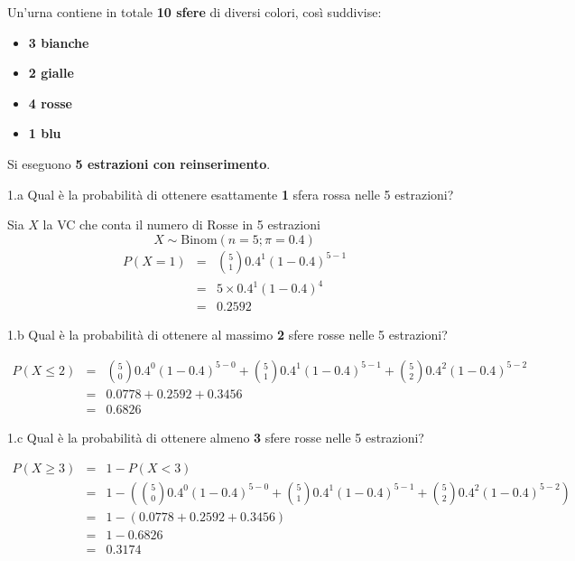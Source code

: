 \documentclass[
  11pt,
]{book}
\providecommand{\tightlist}{%
  \setlength{\itemsep}{0pt}\setlength{\parskip}{0pt}}
\theoremstyle{mytheoremstyle}
\theoremstyle{mydefstyle}
\newenvironment{sol}
  {
  \begin{tcolorbox}[enhanced,breakable,arc=0.1mm,boxrule=1pt,colback=white,colframe=iblue,
  title=\bf \fontfamily{lmss}\selectfont \hspace{.5 cm} Soluzione,drop fuzzy shadow]

}{
\end{tcolorbox}
  }
\begin{document}
Un'urna contiene in totale \textbf{10 sfere} di diversi colori, così suddivise:

\begin{itemize}
\tightlist
\item
  \textbf{3 bianche}\\
\item
  \textbf{2 gialle}\\
\item
  \textbf{4 rosse}\\
\item
  \textbf{1 blu}
\end{itemize}

Si eseguono \textbf{5 estrazioni con reinserimento}.

1.a Qual è la probabilità di ottenere esattamente \textbf{1} sfera rossa nelle 5 estrazioni?

\begin{sol}
Sia \(X\) la VC che conta il numero di Rosse in 5 estrazioni
\[
X\sim\text{Binom}(n=5;\pi=0.4)
\]
\normalsize 
\begin{eqnarray*}
      P( X = 1 ) &=& \binom{ 5 }{ 1 } 0.4 ^{ 1 }(1- 0.4 )^{ 5 - 1 } \\                 &=& 5 \times 0.4 ^{ 1 }(1- 0.4 )^{ 4 } \\                 &=& 0.2592 
   \end{eqnarray*}
\normalsize 

\end{sol}

1.b Qual è la probabilità di ottenere al massimo \textbf{2} sfere rosse nelle 5 estrazioni?

\begin{sol}
\normalsize 
\begin{eqnarray*}
      P( X \leq 2 ) &=& \binom{ 5 }{ 0 } 0.4 ^{ 0 }(1- 0.4 )^{ 5 - 0 }+\binom{ 5 }{ 1 } 0.4 ^{ 1 }(1- 0.4 )^{ 5 - 1 }+\binom{ 5 }{ 2 } 0.4 ^{ 2 }(1- 0.4 )^{ 5 - 2 } \\                 &=& 0.0778+0.2592+0.3456 \\                 &=& 0.6826 
   \end{eqnarray*}
\normalsize 

\end{sol}

1.c Qual è la probabilità di ottenere almeno \textbf{3} sfere rosse nelle 5 estrazioni?

\begin{sol}
\normalsize 
\begin{eqnarray*}
      P( X \geq 3 ) &=& 1-P( X < 3 ) \\                 &=& 1-\left( \binom{ 5 }{ 0 } 0.4 ^{ 0 }(1- 0.4 )^{ 5 - 0 }+\binom{ 5 }{ 1 } 0.4 ^{ 1 }(1- 0.4 )^{ 5 - 1 }+\binom{ 5 }{ 2 } 0.4 ^{ 2 }(1- 0.4 )^{ 5 - 2 } \right)\\                 &=& 1-( 0.0778+0.2592+0.3456 )\\                 &=& 1- 0.6826 \\                 &=&   0.3174 
   \end{eqnarray*}
\normalsize 

\end{sol}
\end{document}
